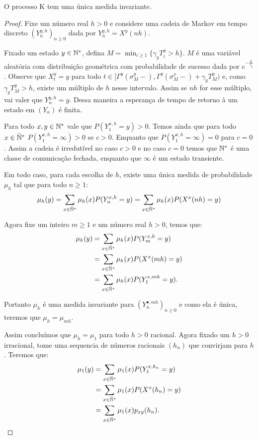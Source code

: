 \begin{proposicao}
  \label{prop:existe-unica-invariante}
  O processo K tem uma única medida invariante.
\end{proposicao}
\begin{proof}
  Fixe um número real $h > 0$ e considere uma cadeia de Markov em
  tempo discreto $(Y^{y, h}_n)_{n \geq 0}$ dada por $Y^{y, h}_n =
  X^y(n h)$.

  Fixado um estado $y \in {\mathbb{N^*}}$, defina $M = \min_{i \geq 1} \{
  \gamma_y T_i^y > h \}$. $M$ é uma variável aleatória com
  distribuição geométrica com probabilidade de sucesso dada por
  $e^{-\frac{h}{\gamma_y}}$. Observe que $X_t^y = y$ para todo $t \in
  [\Gamma^y(\sigma_M^y-), \Gamma^y(\sigma_M^x-) + \gamma_y T_M^y)$ e,
  como $\gamma_y T_M^y > h$, existe um múltiplo de $h$ nesse
  intervalo. Assim se $n h$ for esse múltiplo, vai valer que $Y_n^{y,
    h} = y$. Dessa maneira a esperança de tempo de retorno à um estado
  em $(Y_n)$ é finita.

  Para todo $x, y \in {\mathbb{N^*}}$ vale que $P (Y^{x, h}_1 = y) > 0$. Temos
  ainda que para todo $x \in {\mathbb{\bar{N}^*}}$ $P (Y^{x, h}_1 = \infty ) > 0$ se
  $c > 0$. Enquanto que $P (Y^{x, h}_1 = \infty) = 0$ para $c =
  0$. Assim a cadeia é irredutível no caso $c > 0$ e no caso $c = 0$
  temos que ${\mathbb{N^*}}$ é uma classe de comunicação fechada, enquanto que
  $\infty$ é um estado transiente.


  Em todo caso, para cada escolha de $h$, existe uma única medida de
  probabilidade $\mu_h$ tal que para todo $n \geq 1$:
  \begin{displaymath}
    \mu_h (y) = \sum_{x \in {\mathbb{\bar{N}^*}}} \mu_h(x) P ( Y_n^ {x, h} = y) =
    \sum_{x \in {\mathbb{\bar{N}^*}}} \mu_h(x) P ( X^x (nh) = y)
  \end{displaymath}

  Agora fixe um inteiro $m \geq 1$ e um número real $h > 0$, temos que:
  \begin{align*}
    \mu_h (y) &= \sum_{x \in {\mathbb{\bar{N}^*}}} \mu_h(x) P ( Y_{m}^ {x, h} = y)\\
    &= \sum_{x \in {\mathbb{\bar{N}^*}}} \mu_h(x) P ( X^x (m h) = y) \\
    &= \sum_{x \in {\mathbb{\bar{N}^*}}} \mu_h(x) P ( Y_{1}^ {x, m h} = y).
  \end{align*}

  Portanto $\mu_h$ é uma medida invariante para $(Y^{\bullet, mh}_n)_{n
    \geq 0}$ e como ela é única, teremos que $\mu_h = \mu_{m h}$.

  Assim concluímos que $\mu_{h} = \mu_1$ para todo $h > 0$ racional.
  Agora fixado um $h > 0$ irracional, tome uma sequencia de números
  racionais $(h_n)$ que convirjam para $h$. Teremos que:
  \begin{align*}
    \mu_1(y) &= \sum_{x \in {\mathbb{\bar{N}^*}}} \mu_1(x) P ( Y_{1}^ {x, h_n} = y)\\
    &= \sum_{x \in {\mathbb{\bar{N}^*}}} \mu_1(x) P ( X^x(h_n) = y)\\
    &= \sum_{x \in {\mathbb{\bar{N}^*}}} \mu_1(x) p_{x y} (h_n).    
  \end{align*}
  

\end{proof}
